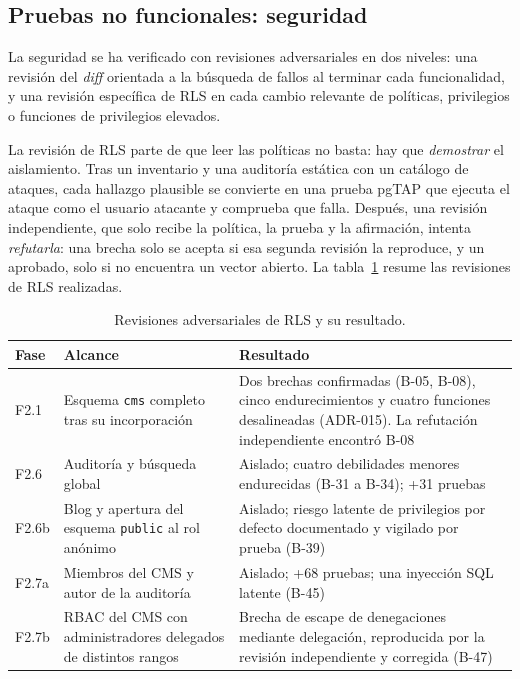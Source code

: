\subsection{Pruebas no funcionales: seguridad}
\label{sec:pru-seguridad}

La seguridad se ha verificado con revisiones adversariales en dos niveles:
una revisión del \textit{diff} orientada a la búsqueda de fallos al terminar
cada funcionalidad, y una revisión específica de RLS en cada cambio relevante
de políticas, privilegios o funciones de privilegios elevados.

La revisión de RLS parte de que leer las políticas no basta: hay que
\emph{demostrar} el aislamiento. Tras un inventario y una auditoría estática
con un catálogo de ataques, cada hallazgo plausible se convierte en una
prueba pgTAP que ejecuta el ataque como el usuario atacante y comprueba que
falla. Después, una revisión independiente, que solo recibe la política, la
prueba y la afirmación, intenta \emph{refutarla}: una brecha solo se acepta
si esa segunda revisión la reproduce, y un aprobado, solo si no encuentra un
vector abierto. La tabla~\ref{tab:pru-rls} resume las revisiones de RLS
realizadas.

\begin{table}[htbp]
  \centering
  \footnotesize
  \caption{Revisiones adversariales de RLS y su resultado.}
  \label{tab:pru-rls}
  \begin{tabularx}{\textwidth}{@{}l>{\raggedright\arraybackslash}p{3.4cm}X@{}}
    \toprule
    \textbf{Fase} & \textbf{Alcance} & \textbf{Resultado} \\
    \midrule
    F2.1 & Esquema \texttt{cms} completo tras su incorporación & Dos brechas confirmadas (B-05, B-08), cinco endurecimientos y cuatro funciones desalineadas (ADR-015). La refutación independiente encontró B-08 \\
    F2.6 & Auditoría y búsqueda global & Aislado; cuatro debilidades menores endurecidas (B-31 a B-34); +31 pruebas \\
    F2.6b & Blog y apertura del esquema \texttt{public} al rol anónimo & Aislado; riesgo latente de privilegios por defecto documentado y vigilado por prueba (B-39) \\
    F2.7a & Miembros del CMS y autor de la auditoría & Aislado; +68 pruebas; una inyección SQL latente (B-45) \\
    F2.7b & RBAC del CMS con administradores delegados de distintos rangos & Brecha de escape de denegaciones mediante delegación, reproducida por la revisión independiente y corregida (B-47) \\
    \bottomrule
  \end{tabularx}
\end{table}


